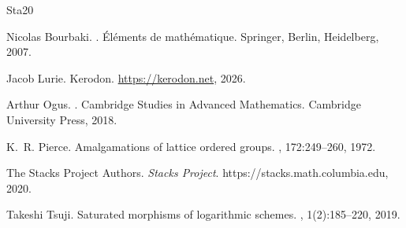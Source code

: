 \documentclass[10pt]{article}
\numberwithin{equation}{section}
\theoremstyle{definition}
\theoremstyle{remark}
\begin{document}

\begin{thebibliography}{{Sta}20}

Nicolas Bourbaki.
.
\newblock Éléments de mathématique. Springer, Berlin, Heidelberg, 2007.

Jacob Lurie.
\newblock Kerodon.
\newblock \url{https://kerodon.net}, 2026.

Arthur Ogus.
.
\newblock Cambridge Studies in Advanced Mathematics. Cambridge University
  Press, 2018.

K.~R. Pierce.
\newblock Amalgamations of lattice ordered groups.
,
  172:249--260, 1972.

The {Stacks Project Authors}.
\newblock \textit{Stacks Project}.
\newblock https://stacks.math.columbia.edu, 2020.

Takeshi Tsuji.
\newblock Saturated morphisms of logarithmic schemes.
, 1(2):185--220, 2019.

\end{thebibliography}
\end{document}
